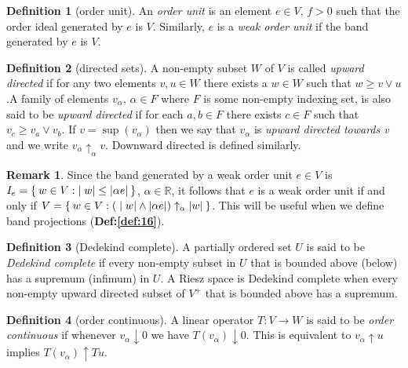 \documentclass[letterpaper,10pt,oneside,onecolumn,reqno]{amsart}
\newcommand{\R}{\mathbb R}
\theoremstyle{definition}
\newtheorem{defn}{Definition}
\newtheorem{rem}{Remark}
\newcommand{\meet}{\wedge}
\newcommand{\join}{\vee}
\begin{document}
\begin{framed}
  \begin{defn}[order unit]\label{def:11}
    An \emph{order unit} is an element $e \in V$, $f
    > 0$ such that the order ideal generated by $e$ is $V$. Similarly,
    $e$ is a \emph{weak order unit} if the band
    generated by $e$ is $V$.
  \end{defn}
  \begin{defn}[directed sets]\label{def:12}
    A non-empty subset $W$ of $V$ is called \emph{upward directed} if for any two elements $v,u \in W$
    there exists a $w \in W$ such that $w \geq v \join u$.A family of
    elements $v_{\alpha}$, $\alpha \in F$ where $F$ is some non-empty
    indexing set, is also said to be \emph{upward directed} if for
    each $a,b \in F$ there exists $c \in F$ such that $v_c \geq v_a
    \join v_b$. If $v = \sup({v_\alpha})$ then we say that
    $v_{\alpha}$ is \emph{upward directed towards v} and we write
    $v_{\alpha}\uparrow_{\alpha} v$. Downward directed is defined
    similarly.
    \begin{rem}\label{rem:2}
      Since the band generated by a weak order unit $e \in V$ is
      $I_{e} = \Set{w \in V: |w| \leq |\alpha e|}$, $\alpha \in \R$,
      it follows that $e$ is a weak order unit if and only if $V =
      \Set{w \in V : (|w| \meet |\alpha e|) \uparrow_{\alpha}
        |w|}$. This will be useful when we define band projections
      (\textbf{Def:\ref{def:16}}).
    \end{rem}
  \end{defn}
\end{framed}

\begin{defn}[Dedekind complete]\label{def:13}
  A partially ordered set $U$ is said to be \emph{Dedekind complete} if every non-empty subset in $U$
  that is bounded above (below) has a supremum (infimum) in $U$. A
  Riesz space is Dedekind complete when every non-empty upward
  directed subset of $V^+$ that is bounded above has a supremum.
\end{defn}

\begin{defn}[order continuous]\label{def:14}
  A linear operator $T : V \to W$ is said to be \emph{order continuous} if whenever $v_{\alpha} \downarrow
  0$ we have $T(v_{\alpha}) \downarrow 0$. This is equivalent to
  $v_{\alpha} \uparrow u$ implies $T(v_{\alpha}) \uparrow Tu$.
\end{defn}
\end{document}
